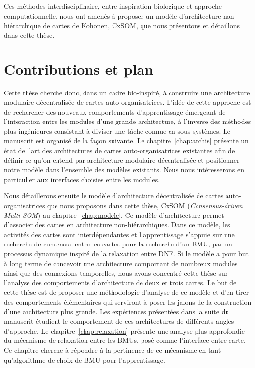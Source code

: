 Ces méthodes interdisciplinaire, entre inspiration biologique et approche computationnelle, nous ont amenés à proposer un modèle d'architecture non-hiérarchique de cartes de Kohonen, CxSOM, que nous présentons et détaillons dans cette thèse.


\section*{Contributions et plan}

Cette thèse cherche donc, dans un cadre bio-inspiré, à construire une architecture modulaire décentralisée de cartes auto-organisatrices. L'idée de cette approche est de rechercher des nouveaux comportements d'apprentissage émergeant de l'interaction entre les modules d'une grande architecture, à l'inverse des méthodes plus ingénieures consistant à diviser une tâche connue en sous-systèmes.
Le manuscrit est organisé de la façon suivante.
Le chapitre~\ref{chap:archis} présente un état de l'art des architectures de cartes auto-organisatrices existantes afin de définir ce qu'on entend par architecture modulaire décentralisée et positionner notre modèle dans l'ensemble des modèles existants. Nous nous intéresserons en particulier aux interfaces choisies entre les modules.

Nous détaillerons ensuite le modèle d'architecture décentralisée de cartes auto-organisatrices que nous proposons dans cette thèse, CxSOM (\emph{Consensus-driven Multi-SOM}) au chapitre~\ref{chap:modele}.
Ce modèle d'architecture permet d'associer des cartes en architecture non-hiérarchiques. Dans ce modèle, les activités des cartes sont interdépendantes et l'apprentissage s'appuie sur une recherche de consensus entre les cartes pour la recherche d'un BMU, par un processus dynamique inspiré de la relaxation entre DNF.
Si le modèle a pour but à long terme de concevoir une architecture comportant de nombreux modules ainsi que des connexions temporelles, nous avons concentré cette thèse sur l'analyse des comportements d'architecture de deux et trois cartes.
Le but de cette thèse est de proposer une méthodologie d'analyse de ce modèle et d'en tirer des comportements élémentaires qui serviront à poser les jalons de la construction d'une architecture plus grande.
Les expériences présentées dans la suite du manuscrit étudient le comportement de ces architectures de différents angles d'approche.
Le chapitre~\ref{chap:relaxation} présente une analyse plus approfondie du mécanisme de relaxation entre les BMUs, posé comme l'interface entre carte. 
Ce chapitre cherche à répondre à la pertinence de ce mécanisme en tant qu'algorithme de choix de BMU pour l'apprentissage.

